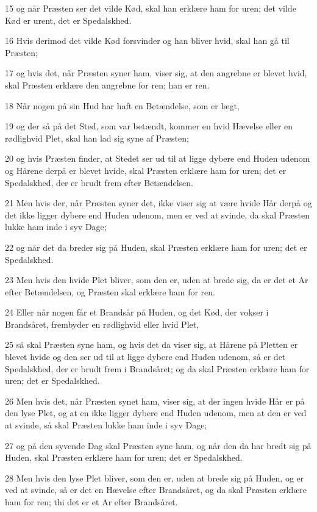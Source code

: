\par 15 og når Præsten ser det vilde Kød, skal han erklære ham for uren; det vilde Kød er urent, det er Spedalskhed.
\par 16 Hvis derimod det vilde Kød forsvinder og han bliver hvid, skal han gå til Præsten;
\par 17 og hvis det, når Præsten syner ham, viser sig, at den angrebne er blevet hvid, skal Præsten erklære den angrebne for ren; han er ren.
\par 18 Når nogen på sin Hud har haft en Betændelse, som er lægt,
\par 19 og der så på det Sted, som var betændt, kommer en hvid Hævelse eller en rødlighvid Plet, skal han lad sig syne af Præsten;
\par 20 og hvis Præsten finder, at Stedet ser ud til at ligge dybere end Huden udenom og Hårene derpå er blevet hvide, skal Præsten erklære ham for uren; det er Spedalskhed, der er brudt frem efter Betændelsen.
\par 21 Men hvis der, når Præsten syner det, ikke viser sig at være hvide Hår derpå og det ikke ligger dybere end Huden udenom, men er ved at svinde, da skal Præsten lukke ham inde i syv Dage;
\par 22 og når det da breder sig på Huden, skal Præsten erklære ham for uren; det er Spedalskhed.
\par 23 Men hvis den hvide Plet bliver, som den er, uden at brede sig, da er det et Ar efter Betændelsen, og Præsten skal erklære ham for ren.
\par 24 Eller når nogen får et Brandsår på Huden, og det Kød, der vokser i Brandsåret, frembyder en rødlighvid eller hvid Plet,
\par 25 så skal Præsten syne ham, og hvis det da viser sig, at Hårene på Pletten er blevet hvide og den ser ud til at ligge dybere end Huden udenom, så er det Spedalskhed, der er brudt frem i Brandsåret; og da skal Præsten erklære ham for uren; det er Spedalskhed.
\par 26 Men hvis det, når Præsten synet ham, viser sig, at der ingen hvide Hår er på den lyse Plet, og at en ikke ligger dybere end Huden udenom, men at den er ved at svinde, så skal Præsten lukke ham inde i syv Dage;
\par 27 og på den syvende Dag skal Præsten syne ham, og når den da har bredt sig på Huden, skal Præsten erklære ham for uren; det er Spedalskhed.
\par 28 Men hvis den lyse Plet bliver, som den er, uden at brede sig på Huden, og er ved at svinde, så er det en Hævelse efter Brandsåret, og da skal Præsten erklære ham for ren; thi det er et Ar efter Brandsåret.
